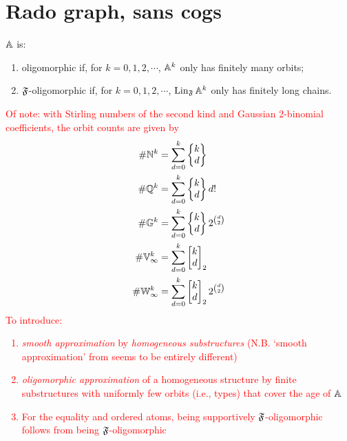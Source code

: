 \section{Rado graph, sans cogs}

$\mathbb{A}$ is: 
\begin{enumerate}
    \item oligomorphic if, for $k = 0, 1, 2, \cdots$, $\mathbb{A}^k$ only has finitely many orbits;
    \item $\mathfrak{F}$-oligomorphic if, for $k = 0, 1, 2, \cdots$, $\operatorname{Lin}_{\mathfrak{F}} \mathbb{A}^k$ only has finitely long chains.
\end{enumerate}
\textcolor{red}{
Of note: with Stirling numbers of the second kind and Gaussian $2$-binomial coefficients,
the orbit counts are given by
\begin{align*}
    \# \mathbb{N}^k &= \sum_{d=0}^k \begin{Bmatrix} k \\ d \end{Bmatrix} \\
    \# \mathbb{Q}^k &= \sum_{d=0}^k \begin{Bmatrix} k \\ d \end{Bmatrix} d! \\
    \# \mathbb{G}^k &= \sum_{d=0}^k \begin{Bmatrix} k \\ d \end{Bmatrix} 2^{\binom{d}{2}} \\
    \# \mathbb{V}_\infty^k &= \sum_{d=0}^k \begin{bmatrix} k \\ d \end{bmatrix}_2 \\
    \# \mathbb{W}_\infty^k &= \sum_{d=0}^k \begin{bmatrix} k \\ d \end{bmatrix}_2 2^{\binom{d}{2}}
\end{align*}
To introduce: 
\begin{enumerate}
    \item 
    \emph{smooth approximation} by \emph{homogeneous substructures} \cite{KLM89} (N.B. `smooth approximation' from \cite[Definition~4]{MP24} seems to be entirely different)
    \item 
    \emph{oligomorphic approximation} of a homogeneous structure by finite substructures with uniformly few orbits (i.e., types)
    that cover the age of $\mathbb{A}$
    \item 
    For the equality and ordered atoms, being supportively $\mathfrak{F}$-oligomorphic follows from being $\mathfrak{F}$-oligomorphic \cite[Theorem~4.10]{BFKM24}
\end{enumerate}}

